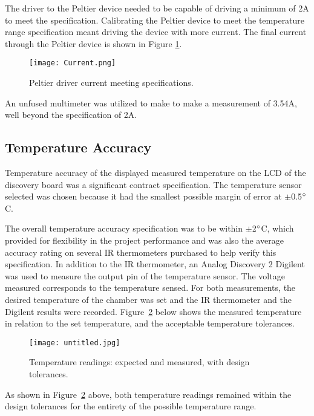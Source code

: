 \documentclass[11pt,letter]{article}
\begin{document}
The driver to the Peltier device needed to be capable of driving a minimum of 2A to meet the specification. Calibrating the Peltier device to meet the temperature range specification meant driving the device with more current. The final current through the Peltier device is shown in Figure \ref{fig:current}.

\begin{figure}[H]
    \centering
    \texttt{[image: Current.png]}
    \caption{Peltier driver current meeting specifications.}
    \label{fig:current}
\end{figure}

An unfused multimeter was utilized to make to make a measurement of 3.54A, well beyond the specification of 2A.

\subsection{Temperature Accuracy}

Temperature accuracy of the displayed measured temperature on the LCD of the discovery board was a significant contract specification. The temperature sensor selected was chosen because it had the smallest possible margin of error at $\pm$0.5$\degree$C. 

The overall temperature accuracy specification was to be within $\pm$2$\degree$C, which provided for flexibility in the project performance and was also the average accuracy rating on several IR thermometers purchased to help verify this specification. In addition to the IR thermometer, an Analog Discovery 2 Digilent was used to measure the output pin of the temperature sensor. The voltage measured corresponds to the temperature sensed. For both measurements, the desired temperature of the chamber was set and the IR thermometer and the Digilent results were recorded. Figure~\ref{fig:comparison} below shows the measured temperature in relation to the set temperature, and the acceptable temperature tolerances.

\begin{figure}[H]
    \centering
    \texttt{[image: untitled.jpg]}
    \caption{Temperature readings: expected and measured, with design tolerances.}
    \label{fig:comparison}
\end{figure}

As shown in Figure~\ref{fig:comparison} above, both temperature readings remained within the design tolerances for the entirety of the possible temperature range.
\end{document}

